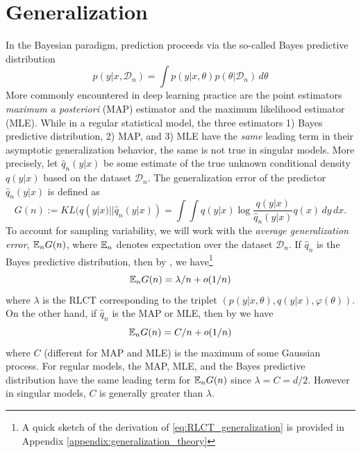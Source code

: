 \documentclass{article} %
\begin{document}
\section{Generalization}\label{section:gen_error}
In the Bayesian paradigm, prediction proceeds via the so-called Bayes predictive distribution
\begin{equation}
p(y|x, \mathcal D_n) = \int p(y|x,\theta) p(\theta|\mathcal D_n) \,d\theta
\label{eq:bayes_pred_dist}
\end{equation}
More commonly encountered in deep learning practice are the point estimators \textit{maximum a posteriori} (MAP) estimator and the maximum likelihood estimator (MLE).
While in a regular statistical model, the three estimators 1) Bayes predictive distribution, 2) MAP, and 3) MLE have the \textit{same} leading term in their asymptotic generalization behavior, the same is not true in singular models.
More precisely, let $\hat q_n(y|x)$ be some estimate of the true unknown conditional density $q(y|x)$ based on the dataset $\mathcal D_n$. The generalization error of the predictor $\hat q_n(y|x)$ is defined as
$$
G(n) := KL (q(y|x) || \hat q_n(y|x) ) = \int  \int q(y|x) \log \frac{q(y|x)}{\hat q_n(y|x)} q(x) \,dy  \,dx.
$$
To account for sampling variability, we will work with the \textit{average generalization error}, ${\mathbb{E}}_n G(n)$, where ${\mathbb{E}}_n$ denotes expectation over the dataset $\mathcal D_n$.
If $\hat q_n$ is the Bayes predictive distribution, then by {\citet[Theorem 1.2 and Theorem 7.2]{watanabe_algebraic_2009}}, we have\footnote{A quick sketch of the derivation of \eqref{eq:RLCT_generalization} is provided in Appendix \ref{appendix:generalization_theory}}
\begin{equation}
{\mathbb{E}}_n G(n) = \lambda/n + o(1/n)
\label{eq:RLCT_generalization}
\end{equation}
where $\lambda$ is the RLCT corresponding to the triplet $( p(y|x,\theta), q(y|x), \varphi(\theta) )$.
On the other hand, if $\hat q_n$ is the MAP or MLE, then by {\cite[Theorem 6.4]{watanabe_algebraic_2009}} we have
$$
{\mathbb{E}}_n G(n) = C/n + o(1/n)
$$
where $C$ (different for MAP and MLE) is the maximum of some Gaussian process. For regular models, the MAP, MLE, and the Bayes predictive distribution have the same leading term for ${\mathbb{E}}_n G(n)$ since $\lambda = C = d/2$. However in singular models, $C$ is generally greater than $\lambda$. 
\end{document}
